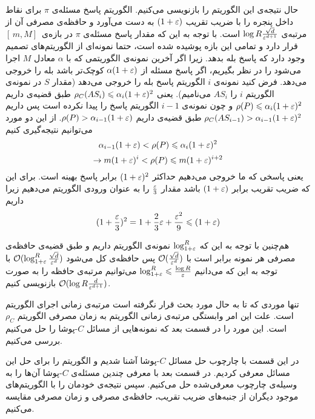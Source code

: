 حال نتیجه‌ی این الگوریتم را بازنویسی می‌کنیم.
الگوریتم   پاسخ مسئله‌ی $\pi$ برای نقاط داخل پنجره را با ضریب تقریب $(1+\varepsilon)$ به دست می‌آورد و حافظه‌ی مصرفی آن از مرتبه‌ی 
$ \log R \frac{\sqrt{d}}{\varepsilon^{d+1}}$
 است.
با توجه به این که مقدار پاسخ مسئله‌ی $\pi$ در بازه‌ی $ [\, m, M]\,$ قرار دارد و تمامی این بازه پوشیده شده است، حتما نمونه‌ای از الگوریتم‌های تصمیم وجود دارد که پاسخ بله بدهد.   زیرا اگر آخرین نمونه‌ی الگوریتمی که با $\alpha$ معادل $M$ اجرا می‌شود را در نظر بگیریم، اگر پاسخ مسئله از 
$\alpha (1 +\varepsilon)$
کوچک‌تر باشد بله را خروجی می‌دهد. فرض کنید نمونه‌ی $i$ الگوریتم پاسخ بله را خروجی می‌دهد (مقدار $S$ در نمونه‌ی الگوریتم $i$ را $AS_i$ می‌نامیم). یعنی
$ \rho_C(AS_i) \leqslant \alpha_i (1 + \varepsilon) ^ 2 $
طبق قضیه‌ی  داریم
$ \rho(P) \leqslant \alpha_i (1 + \varepsilon) ^ 2 $
و چون نمونه‌ی $i-1$ الگوریتم  پاسخ را پیدا نکرده است پس داریم
$ \rho_C(AS_{i-1}) > \alpha_{i-1} (1+\varepsilon)^2$
طبق قضیه‌ی  داریم
$ \rho(P) >  \alpha_{i-1} (1 + \varepsilon) $.
از این دو مورد می‌توانیم نتیجه‌گیری کنیم
$$   \alpha_{i-1} (1 + \varepsilon) < \rho(P) \leqslant  \alpha_i (1 + \varepsilon) ^ 2  $$
$$ \rightarrow m (1+\varepsilon)^i < \rho(P) \leqslant m (1+\varepsilon)^{i+2} $$
یعنی پاسخی که ما خروجی می‌دهیم حداکثر 
$(1 + \varepsilon)^2$
برابر پاسخ بهینه است. برای این که ضریب تقریب برابر $(1+\varepsilon)$ باشد مقدار $\frac{\varepsilon}{3}$ را به عنوان ورودی الگوریتم می‌دهیم زیرا داریم
$$ (1+\frac{\varepsilon}{3})^2 = 1 + \frac{2}{3} \varepsilon + \frac{\varepsilon^2}{9} \leqslant (1+\varepsilon)$$

هم‌چنین با توجه به این که $\log_{1+\varepsilon}^{R} $ نمونه‌ی الگوریتم داریم و طبق قضیه‌ی  حافظه‌ی مصرفی هر نمونه برابر است با 
$\mathcal{O}(\frac{\sqrt{d}}{\varepsilon^d})$
  پس حافظه‌ی کل می‌شود 
$ \mathcal{O}(\log_{1+\varepsilon}^{R} \frac{\sqrt{d}}{\varepsilon^d})$
با توجه به این که می‌دانیم
$ \log_{1+\varepsilon}^{R} \leqslant \frac{\log R}{\varepsilon} $
می‌توانیم مرتبه‌ی حافظه را به صورت
$ \mathcal{O}(\log R \frac{d}{\varepsilon^{d+1}})$
بازنویسی کنیم.

 تنها موردی که تا به حال مورد بحث قرار نگرفته است مرتبه‌ی زمانی اجرای الگوریتم است. علت این امر وابستگی مرتبه‌ی زمانی الگوریتم‌  به زمان مصرفی الگوریتم $\rho_C$ است. این مورد را در قسمت بعد که نمونه‌هایی از مسائل $C$-پوشا را حل می‌کنیم بررسی می‌کنیم.
 
 در این قسمت با چارچوب حل مسائل $C$-پوشا آشنا شدیم و الگوریتم  را برای حل این مسائل معرفی کردیم. در قسمت بعد با معرفی چندین مسئله‌ی $C$-پوشا آن‌ها را به وسیله‌ی چارچوب معرفی‌شده حل می‌کنیم.  سپس  نتیجه‌ی خودمان را با الگوریتم‌های موجود دیگران از جنبه‌های ضریب تقریب، حافظه‌ی مصرفی و زمان مصرفی مقایسه می‌کنیم.
 

